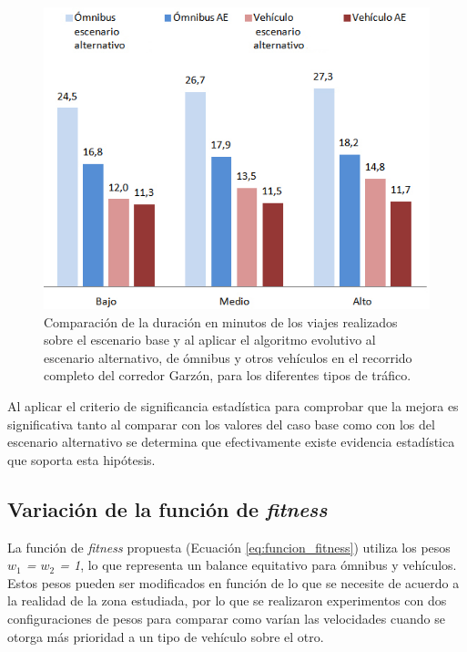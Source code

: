 \begin{figure}[ht]
	\centering
	\includegraphics[width=0.8\linewidth]{Figures/duracio_viajes_alternativo}
	\caption[Comparación de la duración de los viajes en minutos entre el escenario base y el algoritmo evolutivo sobre el escenario alternativo.]{Comparación de la duración en minutos de los viajes realizados sobre el escenario base y al aplicar el algoritmo evolutivo  al escenario alternativo, de ómnibus y otros vehículos en el recorrido completo del corredor Garzón, para los diferentes tipos de tráfico.}
	\label{fig:duracion_viajes_alernativo}
\end{figure}

Al aplicar el criterio de significancia estadística para comprobar que la mejora es significativa tanto al comparar con los valores del caso base como con los del escenario alternativo se determina que efectivamente existe evidencia estadística que soporta esta hipótesis.

\subsection{Variación de la función de \emph{fitness}}

La función de \emph{fitness} propuesta (Ecuación \ref{eq:funcion_fitness}) utiliza los pesos \emph{$w_1$ = $w_2$ = 1}, lo que representa un balance equitativo para ómnibus y vehículos. Estos pesos pueden ser modificados en función de lo que se necesite de acuerdo a la realidad de la zona estudiada, por lo que se realizaron experimentos con dos configuraciones de pesos para comparar como varían las velocidades cuando se otorga más prioridad a un tipo de vehículo sobre el otro.



